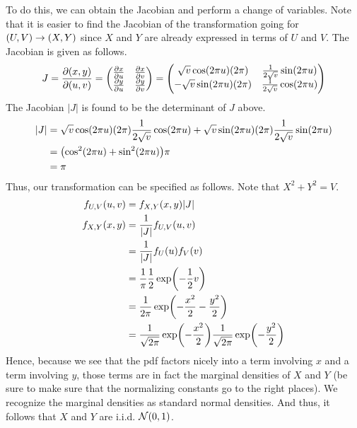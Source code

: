 \documentclass[11.5pt]{article}
\begin{document}
\begin{solution}{3}
To do this, we can obtain the Jacobian and perform a change of variables. Note that it is easier to find the Jacobian of the transformation going for $\paren{U, V} \rightarrow \paren{X, Y}$ since $X$ and $Y$ are already expressed in terms of $U$ and $V$. The Jacobian is given as follows.
$$J = \frac{\partial(x, y)}{\partial(u, v)} = \begin{pmatrix}
\frac{\partial x}{\partial u} & \frac{\partial x}{\partial v} \\
\frac{\partial y}{\partial u} & \frac{\partial y}{\partial v} \\
\end{pmatrix} = \begin{pmatrix}
\sqrt{v} \cos\paren{2 \pi u} \paren{2 \pi} & \frac{1}{2 \sqrt{v}} \sin\paren{2 \pi u} \\
- \sqrt{v} \sin\paren{2 \pi u} \paren{2 \pi} & \frac{1}{2 \sqrt{v}} \cos\paren{2 \pi u} \\
\end{pmatrix}$$
The Jacobian $|J|$ is found to be the determinant of $J$ above.
\begin{align*}
|J| &= \sqrt{v} \cos\paren{2 \pi u} \paren{2 \pi} \frac{1}{2 \sqrt{v}} \cos\paren{2 \pi u} + \sqrt{v} \sin\paren{2 \pi u} \paren{2 \pi} \frac{1}{2 \sqrt{v}} \sin\paren{2 \pi u} \\
&= \paren{\cos^2\paren{2 \pi u} + \sin^2\paren{2 \pi u}} \pi \\
&= \pi
\end{align*}
Thus, our transformation can be specified as follows. Note that $X^2 + Y^2 = V$.
\begin{align*}
f_{U, V}(u, v) &= f_{X, Y}(x, y) |J| \\
f_{X, Y}(x, y) &= \frac{1}{|J|} f_{U, V}(u, v) \\
&= \frac{1}{|J|} f_{U}(u) f_{V}(v) \\
&= \frac{1}{\pi}\frac{1}{2}\exp\paren{- \frac{1}{2}v} \\
&= \frac{1}{2\pi}\exp\paren{- \frac{x^2}{2} - \frac{y^2}{2}} \\
&= \frac{1}{\sqrt{2\pi}}\exp\paren{-\frac{x^2}{2}}\frac{1}{\sqrt{2\pi}}\exp\paren{-\frac{y^2}{2}}
\end{align*}
Hence, because we see that the pdf factors nicely into a term involving $x$ and a term involving $y$, those terms are in fact the marginal densities of $X$ and $Y$ (be sure to make sure that the normalizing constants go to the right places). We recognize the marginal densities as standard normal densities. And thus, it follows that $X$ and $Y$ are i.i.d. $\mathcal{N}(0, 1)$.
\end{solution}
\end{document}
